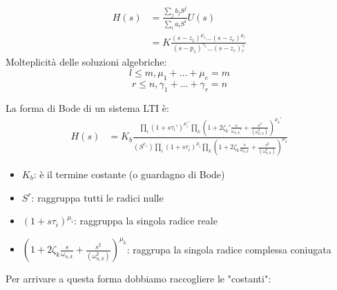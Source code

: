 \documentclass[a4paper]{article}
\begin{document}
\begin{align*}
    H(s) &= \frac{{\sum_j b_j S^j}}{{\sum_i a_i S^i}}U(s)\\
    &= K\frac{(s-z_1)^{\mu_1} \dots (s - z_e)^{\mu_e}}{(s-p_1)^{\gamma_1} \dots (s - z_r){^\gamma_r}}
\end{align*}
Molteplicità delle soluzioni algebriche:
\[l \le m, \mu_1 + \dots + \mu_e = m\]
\[r \le n, \gamma_1 + \dots + \gamma_r = n\]
\begin{theorem}
    La forma di Bode di un sistema LTI è:
\begin{align*}
    H(s) &= K_b \frac{\prod_i (1 + s\tau_i')^{\mu_i'} \prod_k \left(1 + 2\zeta_k' \frac{s}{\omega_{n,k}'} + \frac{s^2}{(\omega_{n,k}^2)}\right)^{\mu_k'}}{(S^{r_1})\prod_i (1 + s\tau_i)^{\mu_i} \prod_k \left(1 + 2\zeta_k \frac{s}{\omega_{n,k}} + \frac{s^2}{(\omega_{n,k}^2)}\right)^{\mu_k}}
\end{align*}
\begin{itemize}
    \item[] $K_b$: è il termine costante (o guardagno di Bode)
    \item[] $S^r$: raggruppa tutti le radici nulle
    \item[] $(1+s\tau_i)^{\mu_i}$: raggruppa la singola radice reale 
    \item[] $\left(1 + 2\zeta_k \frac{s}{\omega_{n,k}} + \frac{s^2}{(\omega_{n,k}^2)}\right)^{\mu_k}$: raggrupa la singola radice complessa coniugata
\end{itemize}
\end{theorem}
Per arrivare a questa forma dobbiamo raccogliere le "costanti":
\end{document}
